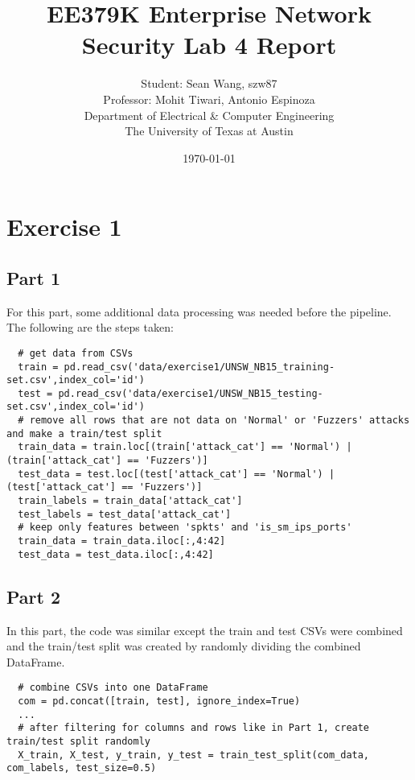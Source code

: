 \documentclass[11pt]{article}
\author{Student: Sean Wang, szw87 \\ Professor: Mohit Tiwari, Antonio Espinoza \\ Department of Electrical \& Computer Engineering \\ The University of Texas at Austin}
\date{\today}
\title{EE379K Enterprise Network Security Lab 4 Report}
\begin{document}
\maketitle
\section*{Exercise 1}
\subsection*{Part 1}
For this part, some additional data processing was needed before the pipeline. The following are the steps taken:
\begin{verbatim}
  # get data from CSVs
  train = pd.read_csv('data/exercise1/UNSW_NB15_training-set.csv',index_col='id')
  test = pd.read_csv('data/exercise1/UNSW_NB15_testing-set.csv',index_col='id')
  # remove all rows that are not data on 'Normal' or 'Fuzzers' attacks and make a train/test split
  train_data = train.loc[(train['attack_cat'] == 'Normal') | (train['attack_cat'] == 'Fuzzers')]
  test_data = test.loc[(test['attack_cat'] == 'Normal') | (test['attack_cat'] == 'Fuzzers')]
  train_labels = train_data['attack_cat']
  test_labels = test_data['attack_cat']
  # keep only features between 'spkts' and 'is_sm_ips_ports'
  train_data = train_data.iloc[:,4:42]
  test_data = test_data.iloc[:,4:42]
\end{verbatim}
\subsection*{Part 2}
In this part, the code was similar except the train and test CSVs were combined and the train/test split was created by randomly dividing the combined DataFrame.
\begin{verbatim}
  # combine CSVs into one DataFrame
  com = pd.concat([train, test], ignore_index=True)
  ...
  # after filtering for columns and rows like in Part 1, create train/test split randomly
  X_train, X_test, y_train, y_test = train_test_split(com_data, com_labels, test_size=0.5)
\end{verbatim}
\end{document}
